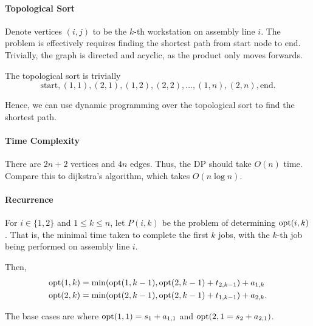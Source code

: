 \paragraph{Topological Sort}
Denote vertices \(\left( i, j \right) \) to be the \(k\)-th workstation on assembly
line  \(i\). The problem is effectively requires finding the shortest path
from start node to end.
Trivially, the graph is directed and acyclic, as the product only moves
forwards.

The topological sort is trivially \[
  \text{start}, (1, 1), (2, 1), (1, 2), (2, 2), \ldots, (1, n), (2, n), \text{end}
.\] 

Hence, we can use dynamic programming over the topological sort to
find the shortest path.

\paragraph{Time Complexity}
There are \(2n + 2\) vertices and  \(4n\) edges. Thus, the  DP should
take \(O(n)\) time. Compare this to dijkstra's algorithm, which takes
\(O(n \log n)\).

\paragraph{Recurrence}
For \(i \in \{1, 2\} \) and \(1 \leq k \leq n\), let  \(P(i, k)\)
be the problem of determining  \(\mathrm{opt}(i, k)\). That is, the minimal time taken to complete
the first  \(k\) jobs, with the  \(k\)-th job being performed on assembly line \(i\).

Then,
\begin{align*}
  \mathrm{opt}(1, k) &= \min( \mathrm{opt}(1, k - 1), \mathrm{opt}(2, k -1) + t_{2, k - 1} )  + a_{1, k} \\
  \mathrm{opt}(2, k) &= \min( \mathrm{opt}(2, k - 1), \mathrm{opt}(2, k -1) + t_{1, k - 1} )  + a_{2, k}
.\end{align*}

The base cases are where \(\mathrm{opt}(1, 1) = s_1 + a_{1, 1}\) and \(\mathrm{opt}(2, 1 = s_{2} + a_{2, 1})\).




